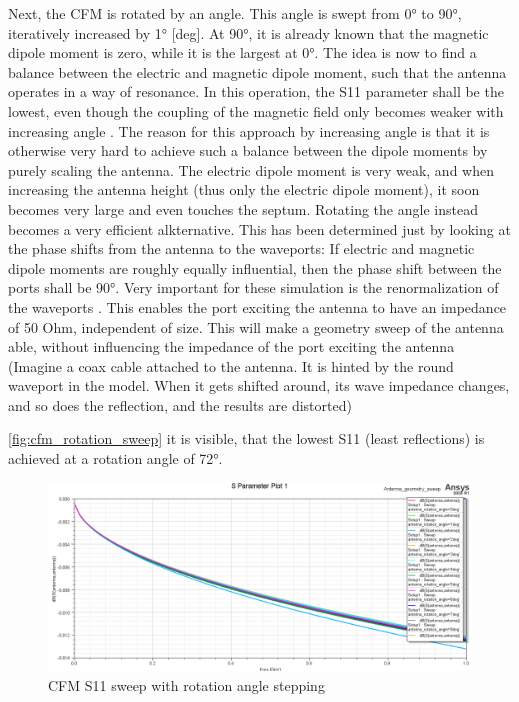 Next, the CFM is rotated by an angle. This angle is swept from 0° to 90°, iteratively increased by 1° [deg]. At 90°, it is already known that the magnetic dipole moment is zero, while it is the largest at 0°. The idea is now to find a balance between the electric and magnetic dipole moment, such that the antenna operates in a way of resonance. In this operation, the S11 parameter shall be the lowest, even though the coupling of the magnetic field only becomes weaker with increasing angle . The reason for this approach by increasing angle is that it is otherwise very hard to achieve such a balance between the dipole moments by purely scaling the antenna. The electric dipole moment is very weak, and when increasing the antenna height (thus only the electric dipole moment), it soon becomes very large and even touches the septum. Rotating the angle instead becomes a very efficient alkternative. This has been determined just by looking at the phase shifts from the antenna to the waveports: If electric and magnetic dipole moments are roughly equally influential, then the phase shift between the ports shall be 90°. Very important for these simulation is the renormalization of the waveports . This enables the port exciting the antenna to have an impedance of 50 Ohm, independent of size. This will make a geometry sweep of the antenna able, without influencing the impedance of the port exciting the antenna (Imagine a coax cable attached to the antenna. It is hinted by the round waveport in the model. When it gets shifted around, its wave impedance changes, and so does the reflection, and the results are distorted) 

\autoref{fig:cfm_rotation_sweep} it is visible, that the lowest S11 (least reflections) is achieved at a rotation angle of 72°. 

\begin{figure}[h]
    \centering
    \includegraphics[width=1\linewidth]{content//30_simulations//img/cfm_rotation_sweep.png}
    \caption{CFM S11 sweep with rotation angle stepping}
    \label{fig:cfm_rotation_sweep}
\end{figure}



